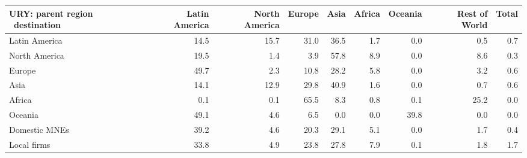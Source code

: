 \begin{tabular}{lrrrrrrrr}
\toprule
URY: parent region \ destination & Latin America & North America & Europe & Asia & Africa & Oceania & Rest of World & Total \\
\midrule
Latin America & 14.5 & 15.7 & 31.0 & 36.5 & 1.7 & 0.0 & 0.5 & 0.7 \\
North America & 19.5 & 1.4 & 3.9 & 57.8 & 8.9 & 0.0 & 8.6 & 0.3 \\
Europe & 49.7 & 2.3 & 10.8 & 28.2 & 5.8 & 0.0 & 3.2 & 0.6 \\
Asia & 14.1 & 12.9 & 29.8 & 40.9 & 1.6 & 0.0 & 0.7 & 0.6 \\
Africa & 0.1 & 0.1 & 65.5 & 8.3 & 0.8 & 0.1 & 25.2 & 0.0 \\
Oceania & 49.1 & 4.6 & 6.5 & 0.0 & 0.0 & 39.8 & 0.0 & 0.0 \\
Domestic MNEs & 39.2 & 4.6 & 20.3 & 29.1 & 5.1 & 0.0 & 1.7 & 0.4 \\
Local firms & 33.8 & 4.9 & 23.8 & 27.8 & 7.9 & 0.1 & 1.8 & 1.7 \\
\bottomrule
\end{tabular}
